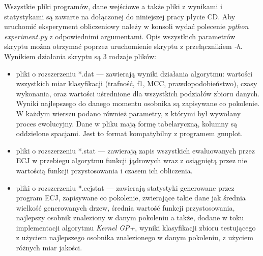 Wszystkie pliki programów, dane wejściowe a także pliki z wynikami i statystykami są zawarte na dołączonej do niniejszej pracy płycie CD.
Aby uruchomić eksperyment obliczeniowy należy w konsoli wydać polecenie \emph{python experiment.py} z odpowiednimi argumentami. Opis wszystkich parametrów skryptu można otrzymać poprzez uruchomienie skryptu z przełącznikiem \emph{-h}. Wynikiem działania skryptu są 3 rodzaje plików:
\begin{itemize}
\item pliki o rozszerzeniu *.dat --- zawierają wyniki działania algorytmu: wartości wszystkich miar klasyfikacji (trafność, f1, MCC, prawdopodobieństwo), czasy wykonania, oraz wartości uśrednione dla wszystkich podziałów zbioru danych. Wyniki najlepszego do danego momentu osobnika są zapisywane co pokolenie. W każdym wierszu podano również parametry, z którymi był wywołany proces ewolucyjny. Dane w pliku mają formę tabelaryczną, kolumny są oddzielone spacjami. Jest to format kompatybilny z programem gnuplot.
\item pliki o rozszerzeniu *.stat --- zawierają zapis wszystkich ewaluowanych przez ECJ w przebiegu algorytmu funkcji jądrowych wraz z osiągniętą przez nie wartością funkcji przystosowania i czasem ich obliczenia.
\item pliki o rozszerzeniu *.ecjstat --- zawierają statystyki generowane przez program ECJ, zapisywane co pokolenie, zwierające takie dane jak średnia wielkość generowanych drzew, średnia wartość funkcji przystosowania, najlepszy osobnik znaleziony w danym pokoleniu a także, dodane w toku implementacji algorytmu \emph{Kernel GP+}, wyniki klasyfikacji zbioru testującego z użyciem najlepszego osobnika znalezionego w danym pokoleniu, z użyciem różnych miar jakości.
\end{itemize}


 \clearpage